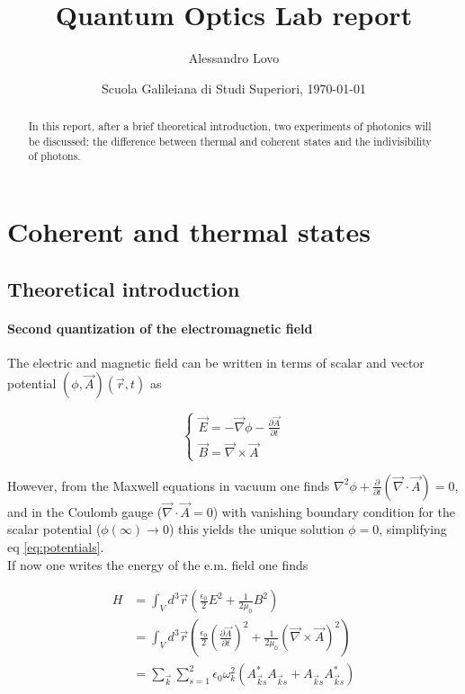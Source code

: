 \documentclass[a4paper, 11pt]{article}
\begin{document}
\title{Quantum Optics Lab report}
\author{Alessandro Lovo}
\date{Scuola Galileiana di Studi Superiori, \today}

\maketitle


\begin{abstract}
  In this report, after a brief theoretical introduction, two experiments of photonics will be discussed: the difference between thermal and coherent states and the indivisibility of photons.
\end{abstract}



\section{Coherent and thermal states}
  \subsection{Theoretical introduction}
    \paragraph{Second quantization of the electromagnetic field}
      The electric and magnetic field can be written in terms of scalar and vector potential $(\phi, \vec{A})(\vec{r},t)$ as

      \begin{equation} \label{eq:potentials}
        \begin{cases}
          \vec{E} = - \vec{\nabla}\phi - \frac{\partial \vec{A}}{\partial t} \\
          \vec{B} = \vec{\nabla} \times \vec{A}
        \end{cases}
      \end{equation}

      However, from the Maxwell equations in vacuum one finds $\nabla^2 \phi + \frac{\partial}{\partial t}(\vec{\nabla} \cdot \vec{A}) = 0$, and in the Coulomb gauge ($\vec{\nabla} \cdot \vec{A} = 0$) with vanishing boundary condition for the scalar potential ($\phi(\infty) \to 0$) this yields the unique solution $\phi = 0$, simplifying eq \ref{eq:potentials}. \\
      If now one writes the energy of the e.m. field one finds


      \begin{align*}
        H & = \int_V d^3\vec{r}\left(\frac{\epsilon_0}{2} E^2 + \frac{1}{2\mu_0} B^2 \right) \\
        &   = \int_V d^3\vec{r}\left(\frac{\epsilon_0}{2} \left(\frac{\partial \vec{A}}{\partial t} \right)^2 + \frac{1}{2\mu_0} \left(\vec{\nabla} \times \vec{A} \right)^2 \right) \\
        &   = \sum_{\vec{k}} \sum_{s = 1}^2 \epsilon_0 \omega_k^2 \left(A_{\vec{k}s}^*A_{\vec{k}s} + A_{\vec{k}s}A_{\vec{k}s}^* \right)
      \end{align*}
\end{document}
